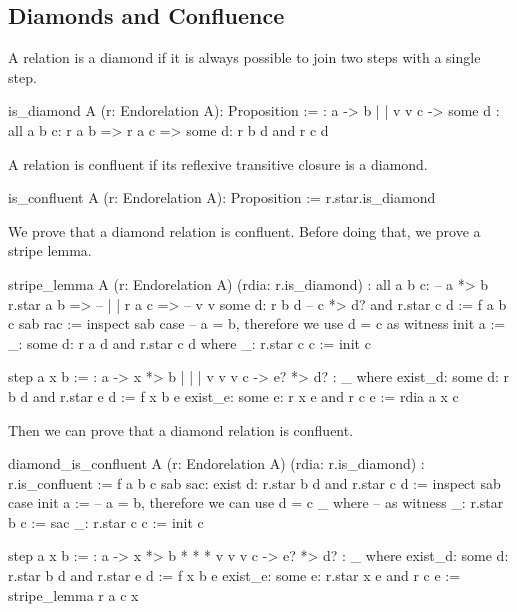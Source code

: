 \subsection{Diamonds and Confluence}


A relation is a diamond if it is always possible to join two steps with a
single step.

\begin{alba}
  is_diamond A (r: Endorelation A): Proposition :=
      {:   a  ->  b
           |      |
           v      v
           c  -> some d :}
    all a b c:
      r a b
      => r a c
      => some d: r b d and r c d
\end{alba}


A relation is confluent if its reflexive transitive closure is a diamond.

\begin{alba}
  is_confluent A (r: Endorelation A): Proposition :=
    r.star.is_diamond
\end{alba}



We prove that a diamond relation is confluent. Before doing that, we prove a
stripe lemma.

\begin{alba}
  stripe_lemma
    A
    (r: Endorelation A)
    (rdia: r.is_diamond)
    : all a b c:                       --  a *> b
        r.star a b =>                  --  |    |
        r a c =>                       --  v    v
        some d: r b d                  --  c *> d?
                and
                r.star c d :=
     f a b c sab rac :=
       inspect sab case   -- a = b, therefore we use d = c as witness
         init a :=
           _: some d: r a d and r.star c d  where
             _: r.star c c := init c

         step a x b :=
           {:  a  -> x  *> b
               |     |     |
               v     v     v
               c  -> e? *> d? :}
           _ where
             exist_d: some d: r b d and r.star e d := f x b e
             exist_e: some e: r x e and r c e      := rdia a x c
\end{alba}

Then we can prove that a diamond relation is confluent.

\begin{alba}
  diamond_is_confluent
    A
    (r: Endorelation A)
    (rdia: r.is_diamond)
    : r.is_confluent
    :=
      f a b c sab sac: exist d: r.star b d and r.star c d :=
        inspect sab case
          init a :=            -- a = b, therefore we can use d = c
            _ where            --        as witness
              _: r.star b c := sac
              _: r.star c c := init c

          step a x b :=
            {:  a  ->  x  *>  b
                *      *      *
                v      v      v
                c  ->  e? *>  d? :}
            _ where
              exist_d: some d: r.star b d and r.star e d := f x b e
              exist_e: some e: r.star x e and r c e := stripe_lemma r a c x

\end{alba}



